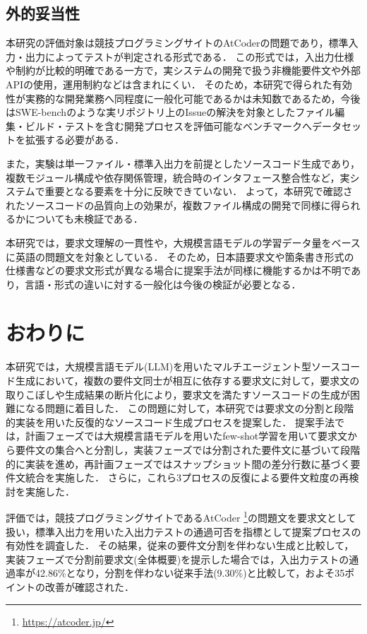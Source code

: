 \documentclass[11pt]{jreport}
\begin{document}
\section{外的妥当性}
本研究の評価対象は競技プログラミングサイトのAtCoderの問題であり，標準入力・出力によってテストが判定される形式である．
この形式では，入出力仕様や制約が比較的明確である一方で，実システムの開発で扱う非機能要件文や外部APIの使用，運用制約などは含まれにくい．
そのため，本研究で得られた有効性が実務的な開発業務へ同程度に一般化可能であるかは未知数であるため，今後はSWE-bench\cite{SWE_bench}のような実リポジトリ上のIssueの解決を対象としたファイル編集・ビルド・テストを含む開発プロセスを評価可能なベンチマークへデータセットを拡張する必要がある．

また，実験は単一ファイル・標準入出力を前提としたソースコード生成であり，複数モジュール構成や依存関係管理，統合時のインタフェース整合性など，実システムで重要となる要素を十分に反映できていない．
よって，本研究で確認されたソースコードの品質向上の効果が，複数ファイル構成の開発で同様に得られるかについても未検証である．

本研究では，要求文理解の一貫性や，大規模言語モデルの学習データ量をベースに英語の問題文を対象としている．
そのため，日本語要求文や箇条書き形式の仕様書などの要求文形式が異なる場合に提案手法が同様に機能するかは不明であり，言語・形式の違いに対する一般化は今後の検証が必要となる．


\chapter{おわりに}
本研究では，大規模言語モデル(LLM)を用いたマルチエージェント型ソースコード生成において，複数の要件文同士が相互に依存する要求文に対して，要求文の取りこぼしや生成結果の断片化により，要求文を満たすソースコードの生成が困難になる問題に着目した．
この問題に対して，本研究では要求文の分割と段階的実装を用いた反復的なソースコード生成プロセスを提案した．
提案手法では，計画フェーズでは大規模言語モデルを用いたfew-shot学習を用いて要求文から要件文の集合へと分割し，実装フェーズでは分割された要件文に基づいて段階的に実装を進め，再計画フェーズではスナップショット間の差分行数に基づく要件文統合を実施した．
さらに，これら3プロセスの反復による要件文粒度の再検討を実施した．

評価では，競技プログラミングサイトであるAtCoder \footnote{\url{https://atcoder.jp/}}の問題文を要求文として扱い，標準入出力を用いた入出力テストの通過可否を指標として提案プロセスの有効性を調査した．
その結果，従来の要件文分割を伴わない生成と比較して，実装フェーズで分割前要求文(全体概要)を提示した場合では，入出力テストの通過率が42.86\%となり，分割を伴わない従来手法(9.30\%)と比較して，およそ35ポイントの改善が確認された．
\end{document}
